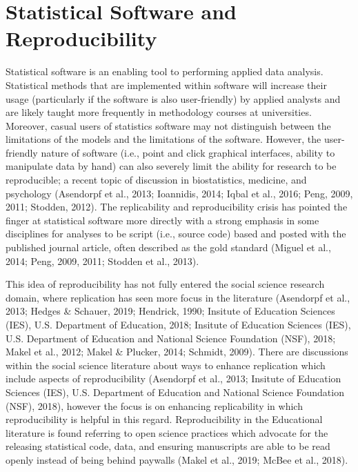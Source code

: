 \documentclass[
  english,
  ,man]{apa7}
\begin{document}
\hypertarget{statistical-software-and-reproducibility}{%
\section{Statistical Software and Reproducibility}\label{statistical-software-and-reproducibility}}

Statistical software is an enabling tool to performing applied data analysis. Statistical methods that are implemented within software will increase their usage (particularly if the software is also user-friendly) by applied analysts and are likely taught more frequently in methodology courses at universities. Moreover, casual users of statistics software may not distinguish between the limitations of the models and the limitations of the software. However, the user-friendly nature of software (i.e., point and click graphical interfaces, ability to manipulate data by hand) can also severely limit the ability for research to be reproducible; a recent topic of discussion in biostatistics, medicine, and psychology (Asendorpf et al., 2013; Ioannidis, 2014; Iqbal et al., 2016; Peng, 2009, 2011; Stodden, 2012). The replicability and reproducibility crisis has pointed the finger at statistical software more directly with a strong emphasis in some disciplines for analyses to be script (i.e., source code) based and posted with the published journal article, often described as the gold standard (Miguel et al., 2014; Peng, 2009, 2011; Stodden et al., 2013).

This idea of reproducibility has not fully entered the social science research domain, where replication has seen more focus in the literature (Asendorpf et al., 2013; Hedges \& Schauer, 2019; Hendrick, 1990; Insitute of Education Sciences (IES), U.S. Department of Education, 2018; Insitute of Education Sciences (IES), U.S. Department of Education and National Science Foundation (NSF), 2018; Makel et al., 2012; Makel \& Plucker, 2014; Schmidt, 2009). There are discussions within the social science literature about ways to enhance replication which include aspects of reproducibility (Asendorpf et al., 2013; Insitute of Education Sciences (IES), U.S. Department of Education and National Science Foundation (NSF), 2018), however the focus is on enhancing replicability in which reproducibility is helpful in this regard. Reproducibility in the Educational literature is found referring to open science practices which advocate for the releasing statistical code, data, and ensuring manuscripts are able to be read openly instead of being behind paywalls (Makel et al., 2019; McBee et al., 2018).
\end{document}
